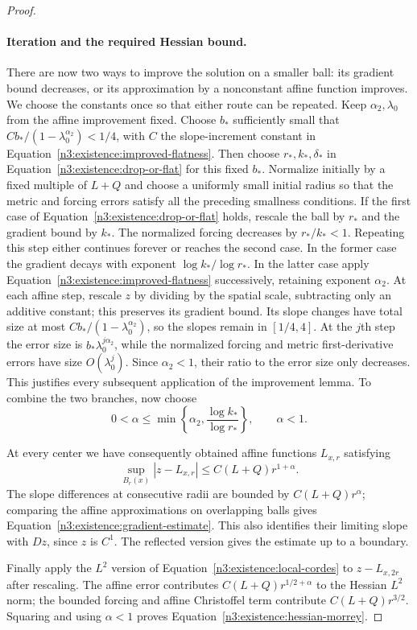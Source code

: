 \begin{proof}
\paragraph{Iteration and the required Hessian bound.}
There are now two ways to improve the solution on a smaller ball:
its gradient bound decreases, or its approximation by a nonconstant
affine function improves. We choose the constants once so that either
route can be repeated.
Keep $\alpha_2,\lambda_0$ from the affine improvement fixed.  Choose
$b_*$ sufficiently small that
$Cb_*/(1-\lambda_0^{\alpha_2})<1/4$, with $C$ the slope-increment
constant in Equation~\eqref{n3:existence:improved-flatness}.
Then choose $r_*,k_*,\delta_*$ in
Equation~\eqref{n3:existence:drop-or-flat} for this fixed $b_*$.
Normalize initially by a fixed multiple of $L+Q$ and choose a
uniformly small initial radius so that the metric and forcing errors
satisfy all the preceding smallness conditions.  If the first case
of Equation~\eqref{n3:existence:drop-or-flat} holds, rescale the ball
by $r_*$ and the gradient bound by $k_*$.  The normalized forcing
decreases by $r_*/k_*<1$.  Repeating this step either continues
forever or reaches the second case.  In the former case the gradient
decays with exponent $\log k_*/\log r_*$.
In the latter case apply Equation~\eqref{n3:existence:improved-flatness}
successively, retaining exponent $\alpha_2$.  At each affine step,
rescale $z$ by dividing by the spatial scale, subtracting only an
additive constant; this preserves its gradient bound.
Its slope changes have total size at most
$Cb_*/(1-\lambda_0^{\alpha_2})$, so the slopes remain in $[1/4,4]$.
At the $j$th step the error size is $b_*\lambda_0^{j\alpha_2}$,
while the normalized forcing and metric first-derivative errors have
size $O(\lambda_0^j)$.  Since $\alpha_2<1$, their ratio to the error
size only decreases.  This justifies every subsequent application
of the improvement lemma.  To combine the two branches, now choose
\begin{equation}\label{n3:existence:iteration-exponent}
 0<\alpha\le\min\left\{\alpha_2,
              \frac{\log k_*}{\log r_*}\right\},\qquad \alpha<1.
\end{equation}

At every center we have consequently obtained affine functions
$L_{x,r}$ satisfying
\begin{equation}\label{n3:existence:campanato-affine}
 \sup_{B_r(x)}|z-L_{x,r}|
 \le C(L+Q)r^{1+\alpha}.
\end{equation}
The slope differences at consecutive radii are bounded by
$C(L+Q)r^\alpha$; comparing the affine approximations on
overlapping balls gives Equation~\eqref{n3:existence:gradient-estimate}.
This also identifies their limiting slope with $Dz$, since $z$ is $C^1$.  The reflected version gives the estimate up to a boundary.

Finally apply the $L^2$ version of
Equation~\eqref{n3:existence:local-cordes} to $z-L_{x,2r}$ after
rescaling.  The affine error contributes
$C(L+Q)r^{1/2+\alpha}$ to the Hessian $L^2$ norm; the bounded
forcing and affine Christoffel term contribute $C(L+Q)r^{3/2}$.
Squaring and using $\alpha<1$ proves
Equation~\eqref{n3:existence:hessian-morrey}.
\end{proof}

